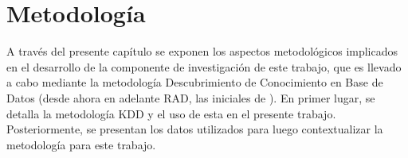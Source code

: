 
\chapter{Metodología}
\label{chp:metodologia}
A través del presente capítulo se exponen los aspectos metodológicos implicados en el desarrollo de la componente de investigación de este trabajo, que es llevado a cabo mediante la metodología Descubrimiento de Conocimiento en Base de Datos (desde ahora en adelante RAD, las iniciales de ). En primer lugar, se detalla la metodología KDD y el uso de esta en el presente trabajo. Posteriormente, se presentan los datos utilizados para luego contextualizar la metodología para este trabajo. 


%
%
%
